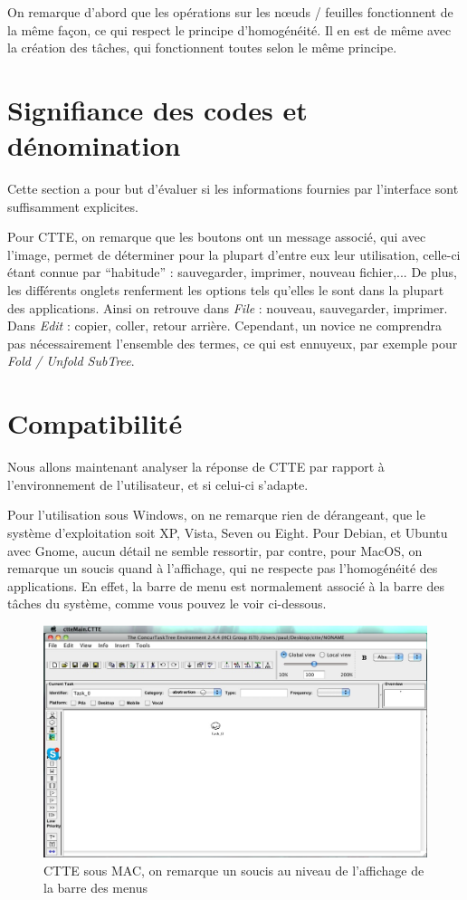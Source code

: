 \documentclass[12pt, a4paper]{article}
\begin{document}
On remarque d'abord que les opérations sur les nœuds / feuilles fonctionnent de la même façon, ce qui respect le principe d'homogénéité. Il en est de même avec la création des tâches, qui fonctionnent toutes selon le même principe.

\section{Signifiance des codes et dénomination}
Cette section a pour but d'évaluer si les informations fournies par l'interface sont suffisamment explicites.

Pour CTTE, on remarque que les boutons ont un message associé, qui avec l'image, permet de déterminer pour la plupart d'entre eux leur utilisation, celle-ci étant connue par ``habitude'' : sauvegarder, imprimer, nouveau fichier,... De plus, les différents onglets renferment les options tels qu'elles le sont dans la plupart des applications. Ainsi on retrouve dans \emph{File} : nouveau, sauvegarder, imprimer. Dans \emph{Edit} : copier, coller, retour arrière. Cependant, un novice ne comprendra pas nécessairement l'ensemble des termes, ce qui est ennuyeux, par exemple pour \emph{Fold / Unfold SubTree}.

\section{Compatibilité}
Nous allons maintenant analyser la réponse de CTTE par rapport à l'environnement de l'utilisateur, et si celui-ci s'adapte.


Pour l'utilisation sous Windows, on ne remarque rien de dérangeant, que le système d'exploitation soit XP, Vista, Seven ou Eight. Pour Debian, et Ubuntu avec Gnome, aucun détail ne semble ressortir, par contre, pour MacOS, on remarque un soucis quand à l'affichage, qui ne respecte pas l'homogénéité des applications. En effet, la barre de menu est normalement associé à la barre des tâches du système, comme vous pouvez le voir ci-dessous.

\begin{figure}
   \includegraphics[scale = 0.5]{SoucisIHM.jpg}
	\caption{CTTE sous MAC, on remarque un soucis au niveau de l'affichage de la barre des menus}
\end{figure}
\end{document}
